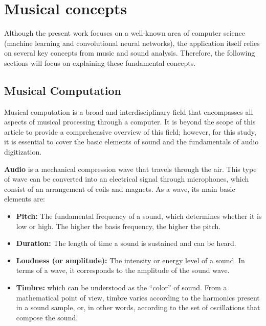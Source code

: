 \documentclass[sigconf,natbib=false]{acmart}
\begin{document}
\section{Musical concepts} \label{sec:fund}

Although the present work focuses on a well-known area of computer science (machine learning and convolutional neural networks), the application itself relies on several key concepts from music and sound analysis. Therefore, the following sections will focus on explaining these fundamental concepts.

\subsection{Musical Computation}  \label{sec:fund}

Musical computation is a broad and interdisciplinary field that encompasses all aspects of musical processing through a computer. It is beyond the scope of this article to provide a comprehensive overview of this field; however, for this study, it is essential to cover the basic elements of sound and the fundamentals of audio digitization.


\textbf{Audio} is a mechanical compression wave that travels through the air. This type of wave can be converted into an electrical signal through microphones, which consist of an arrangement of coils and magnets. As a wave, its main basic elements are:

\begin{itemize}
    \item \textbf{Pitch:} The fundamental frequency of a sound, which determines whether it is low or high. The higher the basis frequency, the higher the pitch.
    \item \textbf{Duration:} The length of time a sound is sustained and can be heard.
    \item \textbf{Loudness (or amplitude):} The intensity or energy level of a sound. In terms of a wave, it corresponds to the amplitude of the sound wave.
    \item \textbf{Timbre:} which can be understood as the ``color'' of sound. From a mathematical point of view, timbre varies according to the harmonics present in a sound sample, or, in other words, according to the set of oscillations that compose the sound.
\end{itemize}
\end{document}
